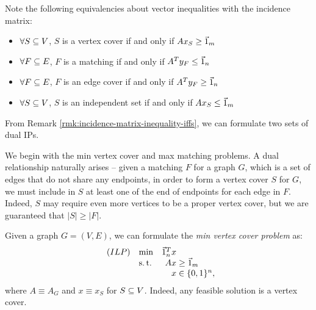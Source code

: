 \begin{rmk}
    \label{rmk:incidence-matrix-inequality-iffs}
    Note the following equivalencies about vector inequalities with the incidence matrix:
    \begin{itemize}
        \item $\forall S \subseteq V$, $S$ is a vertex cover if and only if $A x_S \ge \Vec{1}_m$
        \item $\forall F \subseteq E$, $F$ is a matching if and only if $A^T y_F \le \Vec{1}_n$
        \item $\forall F \subseteq E$, $F$ is an edge cover if and only if $A^T y_F \ge \Vec{1}_n$
        \item $\forall S \subseteq V$, $S$ is an independent set if and only if $Ax_S \le \Vec{1}_m$
    \end{itemize}
\end{rmk}

From Remark \ref{rmk:incidence-matrix-inequality-iffs}, we can formulate two sets of dual IPs.

We begin with the min vertex cover and max matching problems. A dual relationship naturally arises -- given a matching $F$ for a graph $G$, which is a set of edges that do not share any endpoints, in order to form a vertex cover $S$ for $G$, we must include in $S$ at least one of the end of endpoints for each edge in $F$. Indeed, $S$ may require even more vertices to be a proper vertex cover, but we are guaranteed that $|S| \ge |F|$.

\begin{defn}
    \label{def:min-vertex-cover-formulation}
    Given a graph $G=(V,E)$, we can formulate the \textit{min vertex cover problem} as:
        \begin{equation*}
        \begin{array}{llr@{}l@{}}
            (ILP)   & \min  &   \one_n^T x  &               \\
                    & \st   &       Ax      &{}\ge \one_m   \\
                    &       &       x       &{}\in \{0,1\}^n,
        \end{array}
        \end{equation*}
    where $A \equiv A_G$ and $x \equiv x_S$ for $S \subseteq V$. Indeed, any feasible solution is a vertex cover.
\end{defn}

